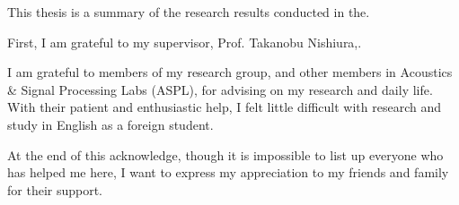 \documentclass[12pt]{article}
\begin{document}
\newpage
\acknowledgements
This thesis is a summary of the research results conducted in the.
\par
First, I am grateful to my supervisor, Prof. Takanobu Nishiura,.
\par
I am grateful to members of my research group, and other members in Acoustics \& Signal Processing Labs (ASPL), for advising on my research and daily life. With their patient and enthusiastic help, I felt little difficult with research and study in English as a foreign student.
\par
At the end of this acknowledge, though it is impossible to list up everyone who has helped me here, I want to express my appreciation to my friends and family for their support.
\newpage

\end{document}
